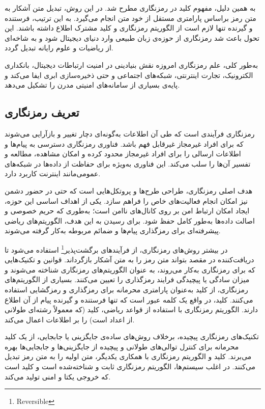 \documentclass[a4paper,12pt]{report}
\renewcommand{\%}{\lr{\oldpercent}}
\providecommand{\LTRfootnote}[1]{\footnote{#1}}
\begin{document}
به همین دلیل، مفهوم کلید در رمزنگاری مطرح شد. در این روش، تبدیل متن آشکار به متن رمز براساس پارامتری مستقل از خود متن انجام می‌گیرد. به این ترتیب، فرستنده و گیرنده تنها لازم است از الگوریتم رمزنگاری و کلید مشترک اطلاع داشته باشند. این تحول باعث شد رمزنگاری از حوزه‌ی زبان طبیعی وارد دنیای دیجیتال شود و به شاخه‌ای از ریاضیات و علوم رایانه تبدیل گردد\cite{ref16}.

به‌طور کلی، علم رمزنگاری امروزه نقش بنیادینی در امنیت ارتباطات دیجیتال، بانکداری الکترونیک، تجارت اینترنتی، شبکه‌های اجتماعی و حتی ذخیره‌سازی ابری ایفا می‌کند و پایه‌ی بسیاری از سامانه‌های امنیتی مدرن را تشکیل می‌دهد.

\subsection{تعریف رمزنگاری}
رمزنگاری فرآیندی است که طی آن اطلاعات به‌گونه‌ای دچار تغییر و بازآرایی می‌شوند که برای افراد غیرمجاز غیرقابل فهم باشد. فناوری رمزنگاری دسترسی به پیام‌ها و اطلاعات ارسالی را برای افراد غیرمجاز محدود کرده و امکان مشاهده، مطالعه و تفسیر آن‌ها را سلب می‌کند. این فناوری به‌ویژه برای حفاظت از داده‌ها در شبکه‌های عمومی‌مانند اینترنت کاربرد دارد\cite{ref17}.

هدف اصلی رمزنگاری، طراحی طرح‌ها و پروتکل‌هایی است که حتی در حضور دشمن نیز امکان انجام فعالیت‌های خاص را فراهم سازد. یکی از اهداف اساسی این حوزه، ایجاد امکان ارتباط امن بر روی کانال‌های ناامن است؛ به‌طوری که حریم خصوصی و اصالت داده‌ها به‌طور کامل حفظ شود. برای رسیدن به این هدف، الگوریتم‌های ریاضی پیشرفته‌ای برای رمزگذاری پیام‌ها و ضمائم مربوطه به‌کار گرفته می‌شوند\cite{ref18}.

در بیشتر روش‌های رمزنگاری، از فرآیندهای برگشت‌پذیر\LTRfootnote{Reversible} استفاده می‌شود تا دریافت‌کننده در مقصد بتواند متن رمز را به متن آشکار بازگرداند. قوانین و تکنیک‌هایی که برای رمزنگاری به‌کار می‌روند، به عنوان الگوریتم‌های رمزنگاری شناخته می‌شوند و میزان سادگی یا پیچیدگی فرایند رمزگذاری را تعیین می‌کنند. بسیاری از الگوریتم‌های رمزنگاری، از کلید به‌عنوان پارامتری محرمانه برای رمزگذاری و رمزگشایی استفاده می‌کنند. کلید، در واقع یک کلمه عبور است که تنها فرستنده و گیرنده پیام از آن اطلاع دارند. الگوریتم رمزنگاری با استفاده از قواعد ریاضی، کلید (که معمولاً رشته‌ای طولانی از اعداد است) را بر اطلاعات اعمال می‌کند\cite{ref19}.

تکنیک‌های رمزنگاری پیچیده، برخلاف روش‌های ساده‌ی جایگزینی یا جابجایی، از یک کلید محرمانه برای کنترل توالی‌های طولانی و پیچیده از جایگزینی‌ها و جابجایی‌ها بهره می‌برند. کلید و الگوریتم رمزنگاری با همکاری یکدیگر، متن اولیه را به متن رمز تبدیل می‌کنند. در اغلب سیستم‌ها، الگوریتم رمزنگاری ثابت و شناخته‌شده است و کلید است که خروجی یکتا و امنی تولید می‌کند\cite{ref20}.
\end{document}
